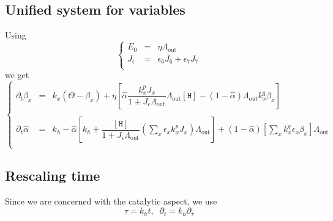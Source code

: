 \documentclass[aps,onecolumn,10pt]{revtex4}
\newcommand{\mychem}[1]{\mathtt{#1}}
\newcommand{\myconc}[1]{\left\lbrack{#1}\right\rbrack}
\newcommand{\spproton}{\mychem{H}}
\newcommand{\proton}{\myconc{\spproton}}
\newcommand{\LiAll}{\Lambda}
\newcommand{\LiAllOut}{{\LiAll}_{\mathrm{out}}}
\begin{document}
\subsection{Unified system for variables}
Using 
\begin{equation}
\left\lbrace
\begin{array}{rcl}
	E_0 &= & \eta \LiAllOut\\
	J_\epsilon & = & \epsilon_6 J_6 + \epsilon_7 J_7\\
\end{array}
\right.
\end{equation}
we get
\begin{equation}
\left\lbrace
\begin{array}{rcl}
\partial_t \beta_x  & = &  k_x \left(\Theta -\beta_x \right) + \eta \left[ \hat\alpha \dfrac{ k_x^p J_x}{1+J_\epsilon \LiAllOut} \LiAllOut \proton -  \left(1-\hat\alpha\right) \LiAllOut k_x^q \beta_x \right] \\
\\
	\partial_t \hat\alpha & = & k_h - \hat\alpha \left\lbrack k_h+ \dfrac{\proton}{1+J_\epsilon \LiAllOut} \left(\sum_x \epsilon_x k_x^p J_x \right) \LiAllOut \right] 
		+ (1-\hat\alpha) \left\lbrack {\sum_x k_x^q \epsilon_x \beta_x }  \right\rbrack \LiAllOut 
		\\
\end{array}
\right.
\end{equation}


\subsection{Rescaling time}
Since we are concerned with the catalytic aspect, we use
\begin{equation}
	\tau = k_h t, \;\;\partial_t = k_h \partial_\tau
\end{equation}
\end{document}
